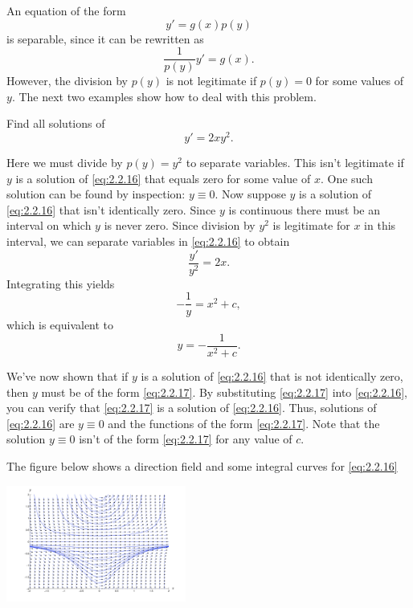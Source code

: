\documentclass{ximera}
\begin{document}
An equation of the form
$$
y'=g(x)p(y)
$$
 is separable, since it can be rewritten as
$$
\frac{1}{p(y)}y'=g(x).
$$
 However, the division by  $p(y)$
is not legitimate  if $p(y)=0$ for some values of $y$.  The
next two examples show how to deal with this problem.

\begin{example}\label{example:2.2.4}
Find all solutions of
\begin{equation} \label{eq:2.2.16}
y'=2xy^2.
\end{equation}

\begin{explanation} 
Here we must divide by $p(y)=y^2$ to separate variables.
This isn't  legitimate if $y$ is a solution of \eqref{eq:2.2.16} that
equals zero for some value of $x$. One such solution can be found by
inspection:  $y \equiv 0$. Now suppose   $y$ is a solution
of \eqref{eq:2.2.16} that isn't  identically zero. Since $y$ is continuous there must be an interval on which $y$ is never zero. Since division
by $y^2$ is legitimate for $x$ in this interval, we can separate
variables in \eqref{eq:2.2.16} to obtain
$$
\frac{y'}{y^2}=2x.
$$
 Integrating this yields
$$
-\frac{1}{y}=x^2+c,
$$
which is equivalent to
\begin{equation} \label{eq:2.2.17}
y=-\frac{1}{x^2+c}.
\end{equation}

We've now shown that if $y$ is a solution of \eqref{eq:2.2.16} that is
not identically zero, then $y$ must be of the form \eqref{eq:2.2.17}. By
substituting \eqref{eq:2.2.17} into \eqref{eq:2.2.16}, you can verify that
\eqref{eq:2.2.17} is  a solution of \eqref{eq:2.2.16}. Thus,
 solutions of \eqref{eq:2.2.16} are $y\equiv 0$ and the functions
of the form \eqref{eq:2.2.17}. Note that the solution $y\equiv 0$ isn't  of
the form \eqref{eq:2.2.17} for any value of $c$.

The figure below shows a direction field and some integral
curves for \eqref{eq:2.2.16}


\begin{image}
  \includegraphics[height=1.5in]{fig020203.jpg}
\end{image}
\end{explanation}
\end{example}
\end{document}

